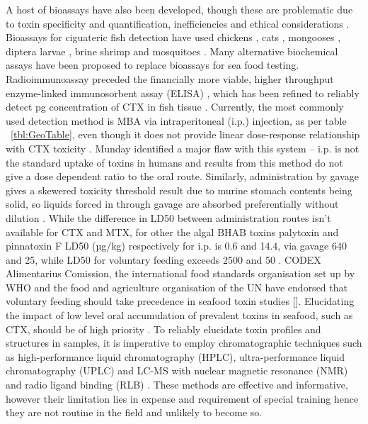 \documentclass[12pt]{article}
\begin{document}
A host of bioassays have also been developed, though these are problematic due to toxin specificity and quantification, inefficiencies and ethical considerations \cite{dickey2010ciguatera}.
Bioassays for ciguateric fish detection have used chickens \cite{vernoux1985chick}, cats \cite{larson1967ciguatera}, mongooses \cite{hokama1977radioimmunoassay}, diptera larvae \cite{labrousse1996toxicological}, brine shrimp \cite{granade1976ciguatera} and mosquitoes \cite{bagnis1987use}.
Many alternative biochemical assays have been proposed to replace bioassays for sea food testing. Radioimmunoassay \cite{hokama1977radioimmunoassay} preceded the financially more viable, higher throughput enzyme-linked immunosorbent assay (ELISA) \cite{hokama1983rapid}, which has been refined to reliably detect pg concentration of CTX in fish tissue \cite{campora2008detection,campora2010evaluating}. Currently, the most commonly used detection method is MBA via intraperitoneal (i.p.) injection, as per table ~\ref{tbl:GeoTable}, even though it does not provide linear dose-response relationship with CTX toxicity \cite{hoffman1983mouse}. 
Munday identified a major flaw with this system – i.p. is not the standard uptake of toxins in humans and results from this method do not give a dose dependent ratio to the oral route. Similarly, administration by gavage gives a skewered toxicity threshold result due to murine stomach contents being solid, so liquids forced in through gavage are absorbed preferentially without dilution \cite{mundyICHA}. While the difference in LD50 between administration routes isn’t available for CTX and MTX, for other the algal BHAB toxins palytoxin and pinnatoxin F LD50 (µg/kg) respectively for i.p. is 0.6 and 14.4, via gavage 640 and 25, while LD50 for voluntary feeding exceeds 2500 and 50 \cite{botana2014seafood}. CODEX Alimentarius Comission, the international food standards organisation set up by WHO and the food and agriculture organisation of the UN have endorsed that voluntary feeding should take precedence in seafood toxin studies []. %
 Elucidating the impact of low level oral accumulation of prevalent toxins in seafood, such as CTX, should be of high priority \cite{mundyICHA}.
To reliably elucidate toxin profiles and structures in samples, it is imperative to employ chromatographic techniques such as high-performance liquid chromatography (HPLC), ultra-performance liquid chromatography (UPLC) and LC-MS with nuclear magnetic resonance (NMR) \cite{legrand1989isolation,murata1990structures,murata1990structures,satake1996isolation,diogened2014chemistry} and radio ligand binding (RLB) \cite{hamilton2002multiple,hamilton2002isolation}. These methods are effective and informative, however their limitation lies in expense and requirement of special training hence they are not routine in the field and unlikely to become so. %
\end{document}
